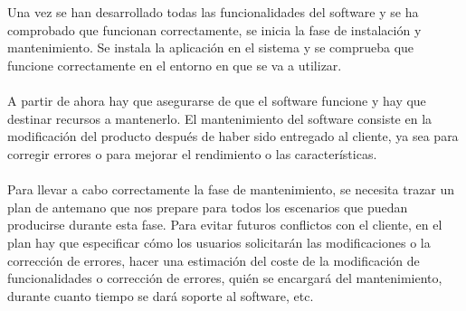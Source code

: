 \\
\\
Una vez se han desarrollado todas las funcionalidades del software y se ha comprobado que funcionan correctamente, se inicia la fase de instalación y mantenimiento. Se instala la aplicación en el sistema y se comprueba que funcione correctamente en el entorno en que se va a utilizar.
\\
\\
A partir de ahora hay que asegurarse de que el software funcione y hay que destinar recursos a mantenerlo. El mantenimiento del software consiste en la modificación del producto después de haber sido entregado al cliente, ya sea para corregir errores o para mejorar el rendimiento o las características.
\\
\\
Para llevar a cabo correctamente la fase de mantenimiento, se necesita trazar un plan de antemano que nos prepare para todos los escenarios que puedan producirse durante esta fase. Para evitar futuros conflictos con el cliente, en el plan hay que especificar cómo los usuarios solicitarán las modificaciones o la corrección de errores, hacer una estimación del coste de la modificación de funcionalidades o corrección de errores, quién se encargará del mantenimiento, durante cuanto tiempo se dará soporte al software, etc.  